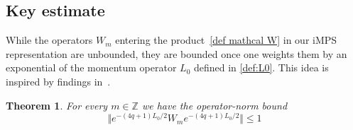 \documentclass[letterpaper, DIV=17]{scrartcl}
\newtheorem{theorem}{Theorem}[section]  %
\numberwithin{equation}{section}
\theoremstyle{definition}
\begin{document}
\subsection{Key estimate}
%
While the operators $ W_m $ entering the product~\eqref{def mathcal W} in our iMPS representation are unbounded, they are bounded once one weights them by an exponential of the momentum operator $ L_0 $ defined in \eqref{def:L0}. This idea is inspired by findings in~\cite{konig2017matrix}. 
%	
		\begin{theorem} \label{thm:key estimate}
			For every $m\in \mathbb{Z}$ we have the operator-norm bound
			\begin{equation} \label{operatornorm bound Wm}
				\Vert e^{-(4q+1) L_0/2 } W_m e^{-(4q+1) L_0/2 } \Vert \leq 1
			\end{equation}
					\end{theorem}
\end{document}
